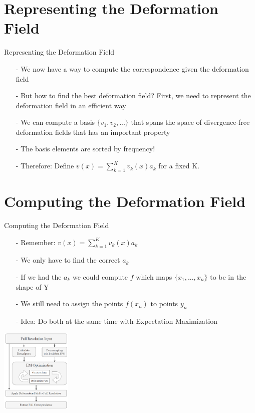 \documentclass[xcolor=dvipsnames]{beamer}
\begin{document}
\section{Representing the Deformation Field}
\begin{frame}{Representing the Deformation Field}
\begin{enumerate}
\item[-] We now have a way to compute the correspondence given the deformation field
\item[-]But how to find the best deformation field? First, we need to represent the deformation field in an efficient way
\item[-] We can compute a basis $\{v_1,v_2,...\}$ that spans the space of divergence-free deformation fields that has an important property
\item[-] The basis elements are sorted by frequency!
\item[-] Therefore: Define $v(x) = \sum_{k=1}^K v_k(x)a_k$ for a fixed K.
\end{enumerate}
\end{frame}

\section{Computing the Deformation Field}
\begin{frame}{Computing the Deformation Field}
\begin{enumerate}
\item[-] Remember: $v(x) = \sum_{k=1}^K v_k(x)a_k$
\item[-] We only have to find the correct $a_k$
\item[-] If we had the $a_k$ we could compute $f$ which maps $\{x_1,...,x_n\}$ to be in the shape of Y
\item[-] We still need to assign the points $f(x_n)$ to points $y_n$
\item[-] Idea: Do both at the same time with Expectation Maximization
\end{enumerate}
\begin{center}
\includegraphics[height=4cm]{Pictures/Pipeline.png}
\end{center}
\end{frame}
\end{document}
